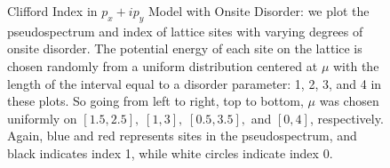 \documentclass[a4paper]{article}
\begin{document}
\begin{figure}
\centering
{}%
%

%
%

\caption{Clifford Index in $p_x + ip_y$ Model with Onsite Disorder: we plot the pseudospectrum and index of lattice sites with varying degrees of onsite disorder.
The potential energy of each site on the lattice is chosen randomly from a uniform distribution centered at $\mu$ with the length of the interval equal to a disorder parameter: 1, 2, 3, and 4 in these plots.
So going from left to right, top to bottom, $\mu$ was chosen uniformly on $[1.5,2.5],\; [1,3],\;[0.5,3.5],$ and $[0,4]$, respectively.
Again, blue and red represents sites in the pseudospectrum, and black indicates index 1, while white circles indicate index 0.
}%
\label{fig:mu_dis_index}%
\end{figure}
\end{document}
